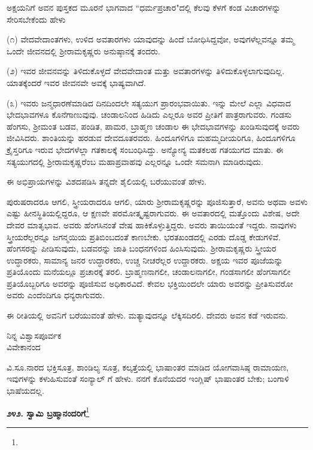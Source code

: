 ಅಕ್ಷಯನಿಗೆ ಅವನ ಪುಸ್ತಕದ ಮೂರನೆ ಭಾಗವಾದ ``ಧರ್ಮಪ್ರಚಾರ"ದಲ್ಲಿ ಕೆಲವು ಕೆಳಗೆ ಕಂಡ ವಿಚಾರಗಳನ್ನು ಸೇರಿಸಬೇಕೆಂದು ಹೇಳು\enginline{-}

(೧) ವೇದವೇದಾಂತಗಳು, ಉಳಿದ ಅವತಾರಗಳು ಯಾವುದನ್ನು ಹಿಂದೆ ಬೋಧಿಸಿ\break ದ್ದವೋ, ಅವುಗಳೆಲ್ಲವನ್ನೂ ತಮ್ಮ ಒಂದೇ ಜೀವನದಲ್ಲಿ ಶ‍್ರೀರಾಮಕೃಷ್ಣರು ಅನುಷ್ಠಾನಕ್ಕೆ ತಂದರು.

(೨) ಇವರ ಜೀವನವನ್ನು ತಿಳಿದುಕೊಳ್ಳದೆ ವೇದವೇದಾಂತ ಮತ್ತು ಅವತಾರಗಳನ್ನು ತಿಳಿದುಕೊಳ್ಳಲಾಗುವುದಿಲ್ಲ. ಯಾತಕ್ಕೆಂದರೆ ಇವರ ಜೀವನವೇ ಅವಕ್ಕೆ ಭಾಷ್ಯವಾಗಿದೆ.

(೩) ಇವರು ಜನ್ಮಧಾರಣೆಮಾಡಿದ ದಿನದಿಂದಲೇ ಸತ್ಯಯುಗ ಪ್ರಾರಂಭವಾಯಿತು. ಇನ್ನು ಮೇಲೆ ಎಲ್ಲಾ ವಿಧವಾದ ಭೇದಭಾವಗಳೂ ಕೊನೆಗಾಣುವುವು. ಚಂಡಾಲನಿಂದ ಹಿಡಿದು ಎಲ್ಲರೂ ಅವರ ಪ್ರೀತಿಗೆ ಪಾತ್ರರಾಗುವರು. ಗಂಡಸು ಹೆಂಗಸು, ಶ‍್ರೀಮಂತ ಬಡವ, ಪಂಡಿತ, ಪಾಮರ, ಬ್ರಾಹ್ಮಣ ಚಂಡಾಲ ಈ ಭೇದಭಾವಗಳನ್ನು ಖಂಡಿಸುವುದಕ್ಕೆ ಅವರು ಜೀವಿಸಿದರು. ಶಾಂತಿಯನ್ನು ಹರಡುವ ದೇವದೂತರವರು. ಹಿಂದೂಗಳಿಗೂ ಮಹಮ್ಮದೀಯರಿಗೂ, ಹಿಂದೂಗಳಿಗೂ ಕ್ರೈಸ್ತರಿಗೂ ಇರುವ ಭೇದಗಳೆಲ್ಲಾ ಗತಕಾಲಕ್ಕೆ ಸಂಬಂಧಿಸಿದ್ದು. ಅನ್ಯೋನ್ಯ ಮತಕಲಹ ಗತಯುಗದ ಮಾತು. ಈ ಸತ್ಯಯುಗದಲ್ಲಿ ಶ‍್ರೀರಾಮಕೃಷ್ಣರೆಂಬ ಮಹಾಪ್ರವಾಹವು ಎಲ್ಲರನ್ನೂ ಒಂದೇ ಸಮನಾಗಿ ಮಾಡಿರುವುದು.

ಈ ಅಭಿಪ್ರಾಯಗಳನ್ನು ವಿಶದಪಡಿಸಿ ತನ್ನದೇ ಶೈಲಿಯಲ್ಲಿ ಬರೆಯುವಂತೆ ಹೇಳು.

ಪುರುಷರಾದರೂ ಆಗಲಿ, ಸ್ತ್ರೀಯರಾದರೂ ಆಗಲಿ, ಯಾರು ಶ‍್ರೀರಾಮಕೃಷ್ಣರನ್ನು ಪೂಜಿಸುತ್ತಾರೆ, ಅವನು ಅಥವಾ ಅವಳು ಎಷ್ಟು ಹೀನಸ್ಥಿತಿಯಲ್ಲಿದ್ದರೂ, ಆ ಕ್ಷಣವೇ ಪರಮೋತ್ಕೃಷ್ಟರಾಗುವರು. ಈ ಅವತಾರದಲ್ಲಿ ಮತ್ತೊಂದು ವಿಶೇಷ, ಅದೇ ದೇವರ ಮಾತೃಭಾವ. ಅವರು ಹೆಂಗಸಿನಂತೆ ವೇಷ ಹಾಕಿಕೊಳ್ಳುತ್ತಿದ್ದರು. ಅವರು ತಾಯಿಯಂತೆ ಇದ್ದರು. ನಾವುಗಳು ಸ್ತ್ರೀಯರೆಲ್ಲರನ್ನೂ ಜಗನ್ಮಯಿಯ ಪ್ರತಿಬಿಂಬದಂತೆ ಕಾಣಬೇಕು. ಭರತಖಂಡದಲ್ಲಿ ಎರಡು ದೊಡ್ಡ ಕೇಡುಗಳಿವೆ. ಹೆಂಗಸರನ್ನು ಪೀಡಿಸುವುದು, ಬಡವರನ್ನು ಜಾತಿ ಬಂಧನಗಳಿಂದ ಹಿಂಸಿಸುವುದು. ಶ‍್ರೀರಾಮಕೃಷ್ಣರು ಸ್ತ್ರೀಯರ ಉದ್ಧಾರಕರು, ಸಾಮಾನ್ಯ ಜನರ ಉದ್ಧಾರಕರು, ಉಚ್ಚ ನೀಚರೆಲ್ಲರ ಉದ್ದಾರಕರು. ಅಕ್ಷಯ ಇವರ ಪೂಜೆಯನ್ನು ಪ್ರತಿಯೊಂದು ಮನೆಯಲ್ಲೂ ಪ್ರಚಾರಕ್ಕೆ ತರಲಿ. ಬ್ರಾಹ್ಮಣನಾಗಲೀ, ಚಂಡಾಲನಾಗಲೀ, ಗಂಡಸಾಗಲೀ ಹೆಂಗಸಾಗಲೀ ಪ್ರತಿಯೊಬ್ಬರಿಗೂ ಅವರನ್ನು ಪೂಜಿಸುವ ಅಧಿಕಾರವಿದೆ. ಕೇವಲ ಭಕ್ತಿಯಿಂದಲೇ ಯಾರು ಅವರನ್ನು ಪ್ರೀತಿಸುವರೋ ಅವರು ಎಂದೆಂದಿಗೂ ಧನ್ಯರಾಗುವರು.

ಈ ರೀತಿಯಲ್ಲಿ ಅವನಿಗೆ ಬರೆಯುವಂತೆ ಹೇಳು. ಮತ್ಯಾವುದನ್ನೂ ಲೆಕ್ಕಿಸದಿರಲಿ. ದೇವರು ಅವನ ಕಡೆ ಇರುವನು.

\begin{flushright}
ನಿನ್ನ ವಿಶ್ವಾಸಪೂರ್ವಕ\\ವಿವೇಕಾನಂದ
\end{flushright}

ವಿ.ಸೂ.\enginline{-}ನಾರದ ಭಕ್ತಿಸೂತ್ರ, ಶಾಂಡಿಲ್ಯ ಸೂತ್ರ, ಕಲ್ಕತ್ತೆಯಲ್ಲಿ ಭಾಷಾಂತರ ಮಾಡಿದ ಯೋಗವಾಸಿಷ್ಠ ರಾಮಾಯಣ, ಇವುಗಳನ್ನು ಕಳುಹಿಸುವಂತೆ ಸಂನ್ಯಾಲ್ ಗೆ ಹೇಳು. ನನಗೆ ಕೊನೆಯದರ ಇಂಗ್ಲಿಷ್ ಭಾಷಾಂತರ ಬೇಕು; ಬಂಗಾಳಿ ಭಾಷೆಯದಲ್ಲ.

\begin{center}
\textbf{೨೪೨. ಸ್ವಾಮಿ ಬ್ರಹ್ಮಾನಂದರಿಗೆ}\footnote{}
\end{center}

